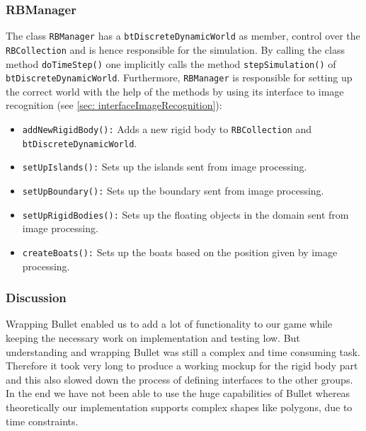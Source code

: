 \subsubsection*{RBManager}
\label{sec: rbManager}
The class \texttt{RBManager} has a \texttt{btDiscreteDynamicWorld} as member, control over the \texttt{RBCollection} and is hence responsible for the simulation. By calling the class method \texttt{doTimeStep()} one implicitly calls the method \texttt{stepSimulation()} of \texttt{btDiscreteDynamicWorld}. 
Furthermore, \texttt{RBManager} is responsible for setting up the correct world with the help of the methods by using its interface to image recognition (see \autoref{sec: interfaceImageRecognition}):
\begin{itemize}
\item \texttt{addNewRigidBody():} Adds a new rigid body to \texttt{RBCollection} and \texttt{btDiscreteDynamicWorld}.
\item \texttt{setUpIslands():} Sets up the islands sent from image processing.
\item \texttt{setUpBoundary():} Sets up the boundary sent from image processing.
\item \texttt{setUpRigidBodies():} Sets up the floating objects in the domain sent from image processing.
\item \texttt{createBoats():} Sets up the boats based on the position given by image processing.
\end{itemize}

\subsubsection{Discussion}
Wrapping Bullet enabled us to add a lot of functionality to our game while keeping the necessary work on implementation and testing low. But understanding and wrapping Bullet was still a complex and time consuming task. Therefore it took very long to produce a working mockup for the rigid body part and this also slowed down the process of defining interfaces to the other groups. In the end we have not been able to use the huge capabilities of Bullet whereas theoretically our implementation supports complex shapes like polygons, due to time constraints.

